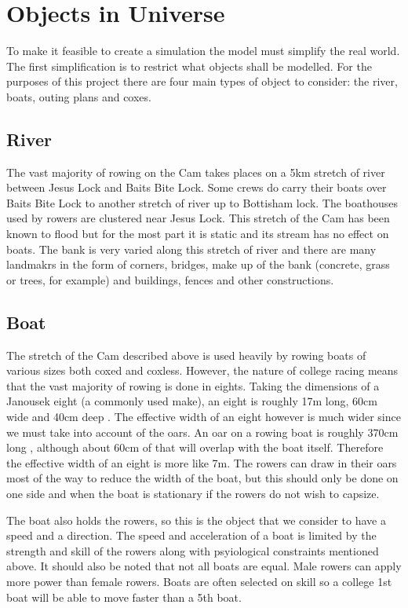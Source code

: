 \section{Objects in Universe}\label{sop:objuni}

To make it feasible to create a simulation the model must simplify the real world. The first simplification is to restrict what objects shall be modelled. For the purposes of this project there are four main types of object to consider: the river, boats, outing plans and coxes. 

\subsection{River} \label{riversubsec}
The vast majority of rowing on the Cam takes places on a 5km stretch
of river between Jesus Lock and Baits Bite Lock. Some crews do carry
their boats over Baits Bite Lock to another stretch of river up to
Bottisham lock. The boathouses used by rowers are clustered near Jesus
Lock. This stretch of the Cam has been known to flood but for the most
part it is static and its stream has no effect on boats. The bank is
very varied along this stretch of river and there are many landmakrs
in the form of corners, bridges, make up of the bank (concrete, grass
or trees, for example) and buildings, fences and other constructions.

\subsection{Boat}
The stretch of the Cam described above is used heavily by rowing boats
of various sizes both coxed and coxless. However, the nature of
college racing means that the vast majority of rowing is done in
eights. Taking the dimensions of a Janousek eight (a commonly used
make), an eight is roughly 17m long, 60cm wide and 40cm deep
\cite{Janousek}. The effective width of an eight however is much wider
since we must take into account of the oars. An oar on a rowing boat
is roughly 370cm long \cite{Concept2}, although about 60cm of that
will overlap with the boat itself. Therefore the effective width of an
eight is more like 7m. The rowers can draw in their oars most of the
way to reduce the width of the boat, but this should only be done on
one side and when the boat is stationary if the rowers do not wish to
capsize.

The boat also holds the rowers, so this is the object that we consider
to have a speed and a direction. The speed and acceleration of a boat
is limited by the strength and skill of the rowers along with
psyiological constraints mentioned above. It should also be noted that
not all boats are equal. Male rowers can apply more power than female
rowers. Boats are often selected on skill so a college 1st boat will
be able to move faster than a 5th boat.

